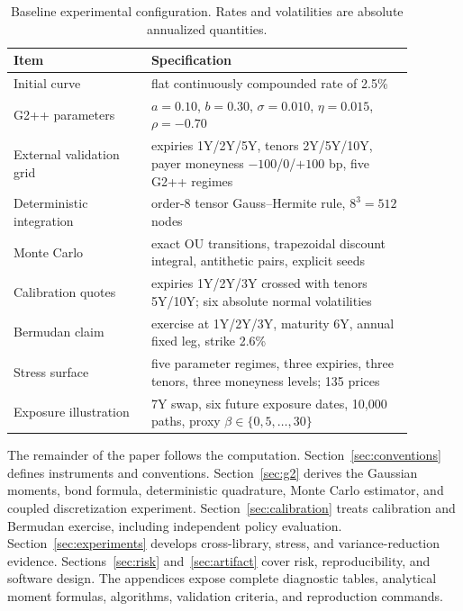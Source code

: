 \documentclass[11pt]{article}
\numberwithin{equation}{section}
\theoremstyle{definition}
\theoremstyle{remark}
\begin{document}
\begin{table}[t]
  \centering
  \small
  \caption{Baseline experimental configuration. Rates and volatilities are
  absolute annualized quantities.}
  \label{tab:baseline-design}
  \begin{tabular}{p{0.30\linewidth}p{0.58\linewidth}}
    \toprule
    Item & Specification\\
    \midrule
    Initial curve & flat continuously compounded rate of 2.5\%\\
    G2++ parameters & $a=0.10$, $b=0.30$, $\sigma=0.010$,
      $\eta=0.015$, $\rho=-0.70$\\
    External validation grid & expiries 1Y/2Y/5Y, tenors 2Y/5Y/10Y,
      payer moneyness $-100$/0/$+100$ bp, five G2++ regimes\\
    Deterministic integration & order-8 tensor Gauss--Hermite rule,
      $8^3=512$ nodes\\
    Monte Carlo & exact OU transitions, trapezoidal discount integral,
      antithetic pairs, explicit seeds\\
    Calibration quotes & expiries 1Y/2Y/3Y crossed with tenors 5Y/10Y;
      six absolute normal volatilities\\
    Bermudan claim & exercise at 1Y/2Y/3Y, maturity 6Y, annual fixed leg,
      strike 2.6\%\\
    Stress surface & five parameter regimes, three expiries, three tenors,
      three moneyness levels; 135 prices\\
    Exposure illustration & 7Y swap, six future exposure dates,
      10,000 paths, proxy $\beta\in\{0,5,\ldots,30\}$\\
    \bottomrule
  \end{tabular}
\end{table}

The remainder of the paper follows the computation. Section~\ref{sec:conventions}
defines instruments and conventions. Section~\ref{sec:g2} derives the Gaussian
moments, bond formula, deterministic quadrature, Monte Carlo estimator, and
coupled discretization experiment. Section~\ref{sec:calibration} treats
calibration and Bermudan exercise, including independent policy evaluation.
Section~\ref{sec:experiments} develops cross-library, stress, and
variance-reduction evidence. Sections~\ref{sec:risk} and~\ref{sec:artifact}
cover risk, reproducibility, and software design. The appendices expose complete
diagnostic tables, analytical moment formulas, algorithms, validation criteria,
and reproduction commands.
\end{document}
